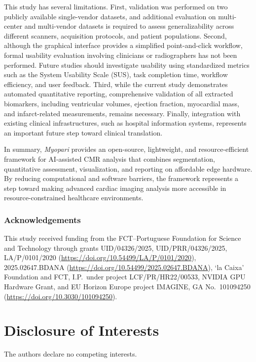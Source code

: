 \documentclass[runningheads]{llncs}
\begin{document}
This study has several limitations. First, validation was performed on two publicly available single-vendor datasets, and additional evaluation on multi-center and multi-vendor datasets is required to assess generalizability across different scanners, acquisition protocols, and patient populations. Second, although the graphical interface provides a simplified point-and-click workflow, formal usability evaluation involving clinicians or radiographers has not been performed. Future studies should investigate usability using standardized metrics such as the System Usability Scale (SUS), task completion time, workflow efficiency, and user feedback. Third, while the current study demonstrates automated quantitative reporting, comprehensive validation of all extracted biomarkers, including ventricular volumes, ejection fraction, myocardial mass, and infarct-related measurements, remains necessary. Finally, integration with existing clinical infrastructures, such as hospital information systems, represents an important future step toward clinical translation.

In summary, \textit{Myopari} provides an open-source, lightweight, and resource-efficient framework for AI-assisted CMR analysis that combines segmentation, quantitative assessment, visualization, and reporting on affordable edge hardware. By reducing computational and software barriers, the framework represents a step toward making advanced cardiac imaging analysis more accessible in resource-constrained healthcare environments.

\subsubsection{Acknowledgements} 
This study received funding from the FCT--Portuguese Foundation for Science and Technology through grants
UID/04326/2025, \linebreak
UID/PRR/04326/2025,
LA/P/0101/2020
(\url{https://doi.org/10.54499/LA/P/0101/2020}),
2025.02647.BDANA
(\url{https://doi.org/10.54499/2025.02647.BDANA}),
`la Caixa' Foundation and FCT, I.P.\ under project 
LCF/PR/HR22/00533,
NVIDIA GPU Hardware Grant,
and EU Horizon Europe project IMAGINE, GA No.~101094250 (\url{https://doi.org/10.3030/101094250}).
\section*{Disclosure of Interests}
The authors declare no competing interests.




\end{document}
